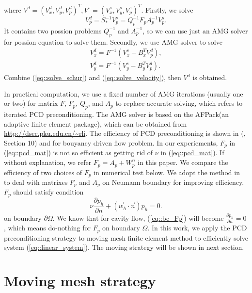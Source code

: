 \documentclass{eajam}
\begin{document}
  where $V^d = (V_x^d, V_y^d, V_p^d)^T, V^s = (V_x^s, V_y^s, V_p^s)^T$.
  Firstly, we solve 
  \begin{equation}
    V_p^d = S_*^{-1} V_p^s = Q_p^{-1} F_p A_p^{-1} V_p^s.
    \label{eq::solve_schur}
  \end{equation}
  It contains two possion problems $Q_p^{-1}$ and $A_p^{-1}$, so we can
  use just an AMG solver for possion equation to solve them.
  Secondly, we use AMG solver to solve 
  \begin{equation}
    \begin{aligned}
      V_x^d = F^{-1} (V_x^s - B_x^T V_p^d), \\
      V_y^d = F^{-1} (V_y^s - B_y^T V_p^d).
    \end{aligned}
    \label{eq::solve_velocity}
  \end{equation}
  Combine (\ref{eq::solve_schur}) and (\ref{eq::solve_velocity}), then
  $V^d$ is obtained.

  In practical computation, we use a fixed number of AMG iterations
  (usually one or two) for matrix $F$, $F_p$, $Q_p$, and $A_p$ to
  replace accurate solving, which refers to iterated PCD
  preconditioning. The AMG solver is based on the AFPack(an adaptive
  finite element package), which can be
  obtained from \url{http://dsec.pku.edu.cn/~rli}. The efficiency of
  PCD preconditioning is shown in (\cite{elman2005finite},
  Section 10) and \cite{elman2011fast} for bouyancy driven flow
  problem. In our experiements, $F_p$ in (\ref{eq::pcd_mat}) is not so
  efficient as getting rid of $\nu$ in (\ref{eq::pcd_mat}). If without
  explanation, we refer $F_p = A_p + W_p^n$ in this paper. We compare
  the efficiency of two choices of $F_p$ in numerical test below. We
  adopt the method in \cite{elman2009boundary} to deal with matrixes
  $F_p$ and $A_p$ on Neumann boundary for improving efficiency. $F_p$
  should satisfy condition
  \begin{equation}
    \nu \frac{\partial p_h}{\partial n} + (\vec{w}_h \cdot \vec{n})
    p_h = 0.
    \label{eq::bc_Fp}
  \end{equation}
  on boundary $\partial \Omega$. We know that for cavity flow,
  (\ref{eq::bc_Fp}) will become $\frac{\partial p_h}{\partial n} =
  0$, which means do-nothing for $F_p$ on boundary $\Omega$. 
  In this work, we apply the PCD preconditioning strategy to moving mesh
  finite element method to efficiently solve system
  (\ref{eq::linear_system}). The moving strategy will be shown in next
  section.
 
\section{Moving mesh strategy}
\end{document}
